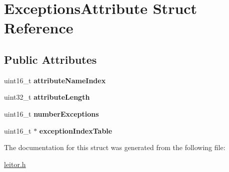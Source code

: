\hypertarget{structExceptionsAttribute}{}\section{Exceptions\+Attribute Struct Reference}
\label{structExceptionsAttribute}
\subsection*{Public Attributes}
\begin{DoxyCompactItemize}
\item 
\mbox{\label{structExceptionsAttribute_a18fa6a96d9f0c1a55230e688d72b2a4c}} 
uint16\+\_\+t {\bfseries attribute\+Name\+Index}
\item 
\mbox{\label{structExceptionsAttribute_ab2bca3da1eb560c5c08449106ff85c54}} 
uint32\+\_\+t {\bfseries attribute\+Length}
\item 
\mbox{\label{structExceptionsAttribute_ae877887aa7835d6a65b2a9dcf313e849}} 
uint16\+\_\+t {\bfseries number\+Exceptions}
\item 
\mbox{\label{structExceptionsAttribute_a6e7edf18fe9cf9f9cae4e4aed16d0837}} 
uint16\+\_\+t $\ast$ {\bfseries exception\+Index\+Table}
\end{DoxyCompactItemize}


The documentation for this struct was generated from the following file\+:\begin{DoxyCompactItemize}
\item 
\mbox{\hyperlink{leitor_8h}{leitor.\+h}}\end{DoxyCompactItemize}
